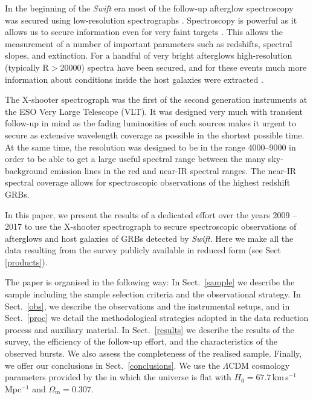 \documentclass[longauth]{aa}    %
\begin{document}
In the beginning of the {\it Swift} era most of the follow-up afterglow
spectroscopy was secured using low-resolution spectrographs \citep[typically
$R=\lambda/\Delta\lambda$$<$1000, e.g.][]{Fynbo2009}. Spectroscopy is powerful
as it allows us to secure information even for very faint targets
\citep{Kruhler2012}. This allows the measurement of a number of important
parameters such as redshifts, spectral slopes, and extinction. For a handful of
very bright afterglows high-resolution (typically R$>$20000) spectra have been
secured, and for these events much more information about conditions inside the
host galaxies were extracted \citep[e.g.][]{Fiore2005, Thone2007,
	Prochaska2007, Vreeswijk2007, DElia2009, Castro-Tirado2010}.

The X-shooter spectrograph \citep{Vernet2011} was the first of the second
generation instruments at the ESO Very Large Telescope (VLT). It was designed
very much with transient follow-up in mind as the fading luminosities of
such sources makes it urgent to secure as extensive wavelength coverage as possible in the
shortest possible time. At the same time, the resolution was designed to be in
the range 4000--9000 in order to be able to get a large useful spectral range
between the many sky-background emission lines in the red and near-IR spectral
ranges. The near-IR spectral coverage allows for spectroscopic observations of
the highest redshift GRBs.

In this paper, we present the results of a dedicated effort over the years 2009
-- 2017 to use the X-shooter spectrograph to secure spectroscopic observations
of afterglows and host galaxies of GRBs detected by {\it Swift}. Here we make
all the data resulting from the survey publicly available in reduced form (see Sect
\ref{products}).

The paper is organised in the following way: In Sect.~\ref{sample} we describe
the sample including the sample selection criteria and the observational
strategy. In Sect.~\ref{obs}, we describe the observations and the instrumental
setups, and in Sect.~\ref{proc} we detail the methodological strategies adopted
in the data reduction process and auxiliary material. In Sect.~\ref{results} we
describe the results of the survey, the efficiency of the follow-up effort,
and the characteristics of the observed bursts. We also assess the
completeness of the realised sample. Finally, we offer our conclusions
in Sect.~\ref{conclusions}. We use the $\Lambda$CDM cosmology parameters
provided by the \citet{Planck2015} in which the universe is flat with $H_0 =
67.7$\,km\,s$^{-1}$ Mpc$^{-1}$ and $\Omega_\mathrm{m} = 0.307$.
\end{document}
